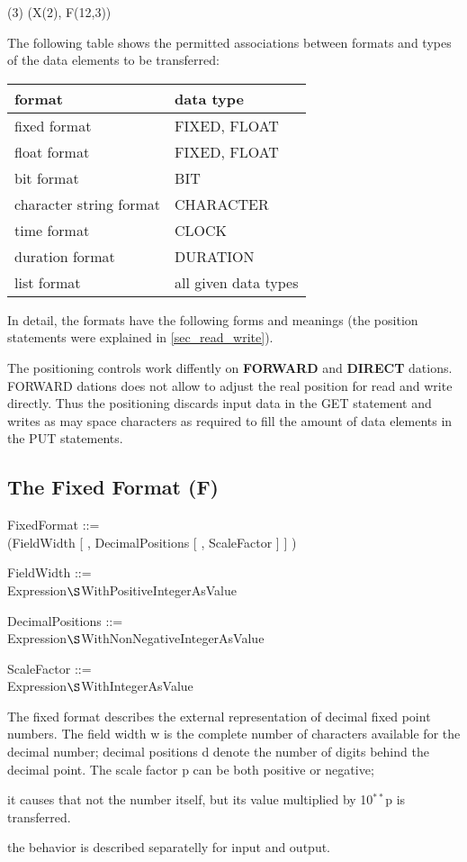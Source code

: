 (3) (X(2), F(12,3))

The following table shows the permitted associations between formats and
types of the data elements to be transferred:

\begin{tabular}{ll}
format                  & data type \\ \hline
fixed format            & FIXED, FLOAT \\
float format            & FIXED, FLOAT \\
bit format              & BIT          \\
character string format & CHARACTER    \\
time format             & CLOCK        \\
duration format         & DURATION     \\
list format             & all given data types
\end{tabular}

In detail, the formats have the following forms and meanings (the
position statements were explained in \ref{sec_read_write}).

\begin{added}
The positioning controls work diffently on {\bf FORWARD} and {\bf DIRECT}
dations. FORWARD dations does not allow to adjust the real position for read
and write directly. 
Thus the positioning discards input data in the GET statement and 
writes as may space characters as required to fill the amount of data elements
in the PUT statements.
\end{added}


\subsection{The Fixed Format (F)}   %
\label{sec_dation_f_format}

FixedFormat ::=\\
 (FieldWidth [ , DecimalPositions [ , ScaleFactor ] ] )

FieldWidth ::=\\
\x Expression$\S $WithPositiveIntegerAsValue

DecimalPositions ::=\\
\x Expression$\S $WithNonNegativeIntegerAsValue

ScaleFactor ::=\\
\x Expression$\S $WithIntegerAsValue

The fixed format describes the external representation of decimal fixed
point numbers. The field width w is the complete number of characters
available for the decimal number; decimal positions d denote the number
of digits behind the decimal point. The scale factor p can be both
positive or negative; 
\begin{removed}
it causes that not the number itself, but its
value multiplied by 10$^{**}$p is transferred.
\end{removed}
\begin{added}
the behavior is described separatelly for input and output.
\end{added}


